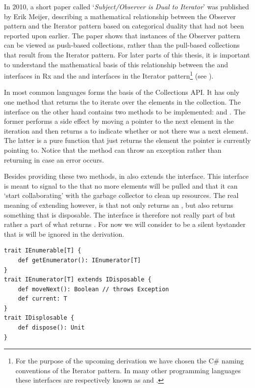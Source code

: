 In 2010, a short paper called `\textit{Subject/Observer is Dual to Iterator}' \cite{meijer2010-Observable} was published by Erik Meijer, describing a mathematical relationship between the Observer pattern and the Iterator pattern based on categorical duality that had not been reported upon earlier. The paper shows that instances of the Observer pattern can be viewed as push-based collections, rather than the pull-based collections that result from the Iterator pattern. For later parts of this thesis, it is important to understand the mathematical basis of this relationship between the \obs and \obv interfaces in Rx and the \ieb and \ier interfaces in the Iterator pattern\footnote{For the purpose of the upcoming derivation we have chosen the C\# naming conventions of the Iterator pattern. In many other programming languages these interfaces are respectively known as  and .} (see ).

In most common languages \ieb forms the basis of the Collections API. It has only one method  that returns the \ier to iterate over the elements in the collection. The \ier interface on the other hand contains two methods to be implemented:  and . The former performs a side effect by moving a pointer to the next element in the iteration and then returns a  to indicate whether or not there was a next element. The latter is a pure function that just returns the element the pointer is currently pointing to. Notice that the  method can throw an exception rather than returning  in case an error occurs.

Besides providing these two methods, \ier in  also extends the \id interface. This interface is meant to signal to the \ieb that no more elements will be pulled and that it can `start collaborating' with the garbage collector to clean up resources. The real meaning of \ier extending \id however, is that  not only returns an \ier, but also returns something that is disposable. The \id interface is therefore not really part of \ier but rather a part of what  returns \cite{E2E-Rx}. For now we will consider \id to be a silent bystander that is will be ignored in the derivation.

\begin{minipage}{\linewidth}
\begin{lstlisting}[style=ScalaStyle, caption={\ieb and \ier interfaces}, label={lst:itb-itr}]
trait IEnumerable[T] {
    def getEnumerator(): IEnumerator[T]
}
trait IEnumerator[T] extends IDisposable {
    def moveNext(): Boolean // throws Exception
    def current: T
}
trait IDisplosable {
    def dispose(): Unit
}
\end{lstlisting}
\end{minipage}

